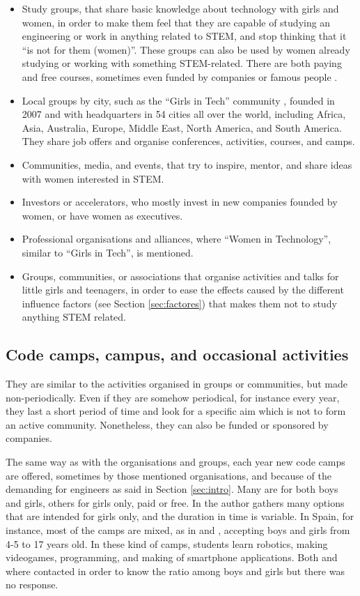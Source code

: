 \documentclass[journal,transmag]{IEEEtran}
\begin{document}
\begin{itemize}
	\item Study groups, that share basic knowledge about technology with girls and women, in order to make them feel that they are capable of studying an engineering or work in anything related to STEM, and stop thinking that it ``is not for them (women)''. These groups can also be used by women already studying or working with something STEM-related. There are both paying and free courses, sometimes even funded by companies or famous people \cite{karliek2012}.
	\item Local groups by city, such as the ``Girls in Tech'' community \cite{git:site}, founded in 2007 and with headquarters in 54 cities all over the world, including Africa, Asia, Australia, Europe, Middle East, North America, and South America. They share job offers and organise conferences, activities, courses, and camps.
	\item Communities, media, and events, that try to inspire, mentor, and share ideas with women interested in STEM.
	\item Investors or accelerators, who mostly invest in new companies founded by women, or have women as executives.
	\item Professional organisations and alliances, where ``Women in Technology'', similar to ``Girls in Tech'', is mentioned.
	\item Groups, communities, or associations that organise activities and talks for little girls and teenagers, in order to ease the effects caused by the different influence factors (see Section \ref{sec:factores}) that makes them not to study anything STEM related.
\end{itemize}

\subsection{Code camps, campus, and occasional activities}

They are similar to the activities organised in groups or communities, but made non-periodically. Even if they are somehow periodical, for instance every year, they last a short period of time and look for a specific aim which is not to form an active community. Nonetheless, they can also be funded or sponsored by companies. 

The same way as with the organisations and groups, each year new code camps are offered, sometimes by those mentioned organisations, and because of the demanding for engineers as said in Section \ref{sec:intro}. Many are for both boys and girls, others for girls only, paid or free. In \cite{lauren2015} the author gathers many options that are intended for girls only, and the duration in time is variable. In Spain, for instance, most of the camps are mixed, as in \cite{cmadrid:site} and \cite{cbcn:site}, accepting boys and girls from 4-5 to 17 years old. In these kind of camps, students learn robotics, making videogames, programming, and making of smartphone applications. Both  \cite{cmadrid:site} and \cite{cbcn:site} where contacted in order to know the ratio among boys and girls but there was no response.
\end{document}
